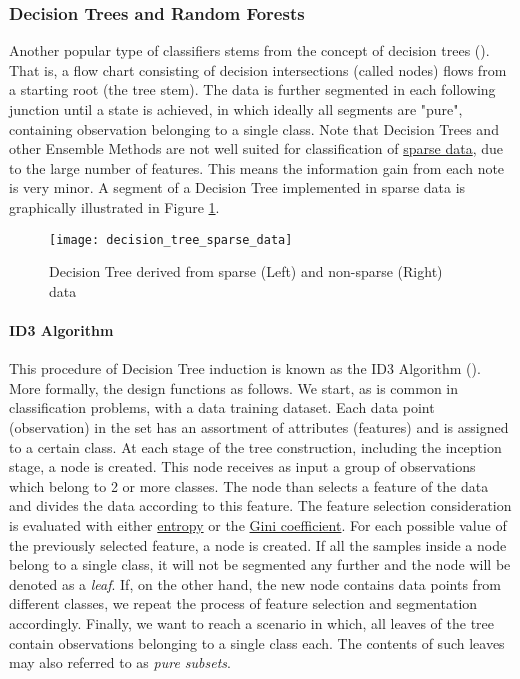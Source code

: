 \subsubsection{Decision Trees and Random Forests}
	Another popular type of classifiers stems from the concept of decision trees (\cite{quinlan2014c4}). That is, a flow chart consisting of decision intersections (called nodes) flows from a starting root (the tree stem). The data is further segmented in each following junction until a state is achieved, in which ideally all segments are "pure", containing observation belonging to a single class. Note that Decision Trees and other Ensemble Methods are not well suited for classification of \hyperref[data_sparsity]{sparse data}, due to the large number of features. This means the information gain from each note is very minor. A segment of a Decision Tree implemented in sparse data is graphically illustrated in Figure \ref{fig:rand_forest_sparse}.
	
	\begin{figure}[h]
		\centering
		\texttt{[image: decision\_tree\_sparse\_data]}
		\captionsetup{width=0.8\textwidth}
		\caption[Decision Tree with Sparse Data]{Decision Tree derived from sparse (Left) and non-sparse (Right) data}
		\label{fig:rand_forest_sparse}
	\end{figure}
		
	\paragraph{ID3 Algorithm} 
		This procedure of Decision Tree induction is known as the ID3 Algorithm (\cite{quinlan1986induction}). More formally, the design functions as follows. We start, as is common in classification problems, with a data training dataset. Each data point (observation) in the set has an assortment of attributes (features) and is assigned to a certain class. At each stage of the tree construction, including the inception stage, a node is created. This node receives as input a group of observations which belong to 2 or more classes. The node than selects a feature of the data and divides the data according to this feature. The feature selection consideration is evaluated with either \hyperref[entropy]{entropy} or the \hyperref[gini]{Gini coefficient}. For each possible value of the previously selected feature, a node is created. If all the samples inside a node belong to a single class, it will not be segmented any further and the node will be denoted as a \textit{leaf}. If, on the other hand, the new node contains data points from different classes, we repeat the process of feature selection and segmentation accordingly. Finally, we want to reach a scenario in which, all leaves of the tree contain observations belonging to a single class each. The contents of such leaves may also referred to as \textit{pure subsets}.
		
